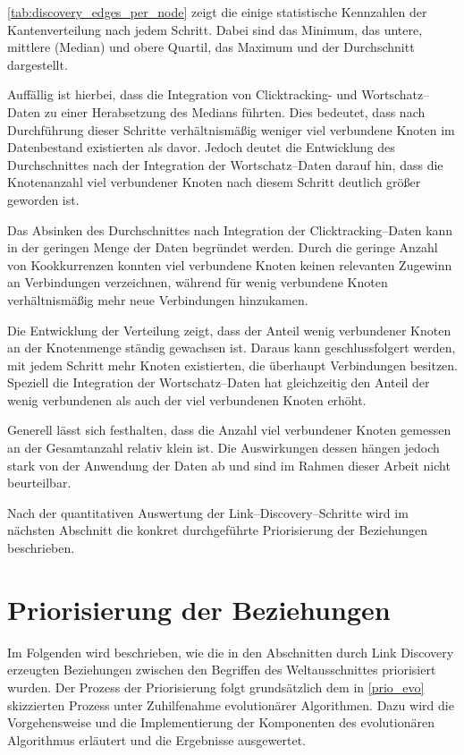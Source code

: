 \cref{tab:discovery_edges_per_node} zeigt die einige statistische Kennzahlen der Kantenverteilung nach jedem Schritt. Dabei sind das Minimum, das untere, mittlere (Median) und obere Quartil, das Maximum und der Durchschnitt dargestellt.

Auffällig ist hierbei, dass die Integration von Clicktracking- und Wortschatz--Daten zu einer Herabsetzung des Medians führten. Dies bedeutet, dass nach Durchführung dieser Schritte verhältnismäßig weniger viel verbundene Knoten im Datenbestand existierten als davor. Jedoch deutet die Entwicklung des Durchschnittes nach der Integration der Wortschatz--Daten darauf hin, dass die Knotenanzahl viel verbundener Knoten nach diesem Schritt deutlich größer geworden ist.

Das Absinken des Durchschnittes nach Integration der Clicktracking--Daten kann in der geringen Menge der Daten begründet werden. Durch die geringe Anzahl von Kookkurrenzen konnten viel verbundene Knoten keinen relevanten Zugewinn an Verbindungen verzeichnen, während für wenig verbundene Knoten verhältnismäßig mehr neue Verbindungen hinzukamen.

Die Entwicklung der Verteilung zeigt, dass der Anteil wenig verbundener Knoten an der Knotenmenge ständig gewachsen ist. Daraus kann geschlussfolgert werden, mit jedem Schritt mehr Knoten existierten, die überhaupt Verbindungen besitzen. Speziell die Integration der Wortschatz--Daten hat gleichzeitig den Anteil der wenig verbundenen als auch der viel verbundenen Knoten erhöht.

Generell lässt sich festhalten, dass die Anzahl viel verbundener Knoten gemessen an der Gesamtanzahl relativ klein ist. Die Auswirkungen dessen hängen jedoch stark von der Anwendung der Daten ab und sind im Rahmen dieser Arbeit nicht beurteilbar.

Nach der quantitativen Auswertung der Link--Discovery--Schritte wird im nächsten Abschnitt die konkret durchgeführte Priorisierung der Beziehungen beschrieben.

\section{Priorisierung der Beziehungen}
\label{lda_prio}

Im Folgenden wird beschrieben, wie die in den Abschnitten  durch Link Discovery erzeugten Beziehungen zwischen den Begriffen des Weltausschnittes priorisiert wurden. Der Prozess der Priorisierung folgt grundsätzlich dem in \cref{prio_evo} skizzierten Prozess unter Zuhilfenahme evolutionärer Algorithmen. Dazu wird die Vorgehensweise und die Implementierung der Komponenten des evolutionären Algorithmus erläutert und die Ergebnisse ausgewertet.

